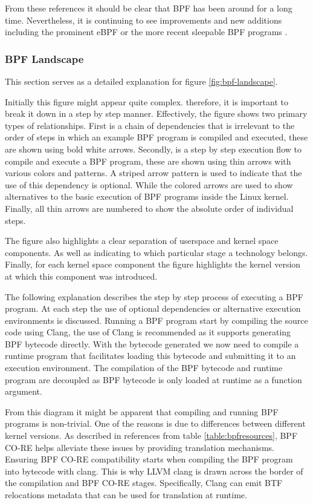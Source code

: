 \documentclass[conference]{IEEEtran}
\begin{document}
From these references it should be clear that BPF has been around for a long
time. Nevertheless, it is continuing to see improvements and new additions
including the prominent eBPF or the more recent sleepable BPF
programs \cite{bpf-features}.

\subsubsection{BPF Landscape}

This section serves as a detailed explanation for
figure \ref{fig:bpf-landscape}.

Initially this figure might appear quite complex. therefore, it is important to
break it down in a step by step manner. Effectively, the figure shows two
primary types of relationships. First is a chain of dependencies that is
irrelevant to the order of steps in which an example BPF program is compiled and
executed, these are shown using bold white arrows. Secondly, is a step by step
execution flow to compile and execute a BPF program, these are shown using thin
arrows with various colors and patterns. A striped arrow pattern is used to
indicate that the use of this dependency is optional. While the colored arrows
are used to show alternatives to the basic execution of BPF programs
inside the Linux kernel. Finally, all thin arrows are numbered to show the
absolute order of individual steps.

The figure also highlights a clear separation of userspace and kernel space
components. As well as indicating to which particular stage a technology
belongs. Finally, for each kernel space component the figure highlights the
kernel version at which this component was introduced.

The following explanation describes the step by step process of executing a BPF
program. At each step the use of optional dependencies or alternative execution
environments is discussed. Running a BPF program start by compiling the source
code using Clang, the use of Clang is recommended as it supports
generating BPF bytecode directly. With the bytecode generated we now need to
compile a runtime program that facilitates loading this bytecode and submitting
it to an execution environment. The compilation of the BPF bytecode and runtime
program are decoupled as BPF bytecode is only loaded at runtime as a function
argument.

From this diagram it might be apparent that compiling and running BPF programs
is non-trivial. One of the reasons is due to differences between different
kernel versions. As described in references from table \ref{table:bpfresources},
BPF CO-RE helps  alleviate these issues by providing translation mechanisms.
Ensuring BPF CO-RE compatibility starts when compiling the BPF program into
bytecode with clang. This is why LLVM clang is drawn across the border of the
compilation and BPF CO-RE stages. Specifically, Clang can emit BTF relocations
metadata that can be used for translation at runtime.
\end{document}
